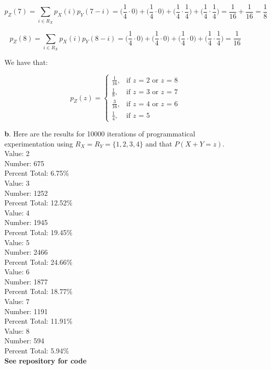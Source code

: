 \begin{solution}
\begin{itemize}
\[p_Z(7) = \sum_{i\in R_X} p_X(i)p_Y(7-i) = \bigg(\frac{1}{4}\cdot0\bigg) + \bigg(\frac{1}{4}\cdot0\bigg) + \bigg(\frac{1}{4}\cdot\frac{1}{4}\bigg) + \bigg(\frac{1}{4}\cdot\frac{1}{4}\bigg)=\frac{1}{16}+\frac{1}{16}=\frac{1}{8}\]

\[p_Z(8) = \sum_{i\in R_X} p_X(i)p_Y(8-i) = \bigg(\frac{1}{4}\cdot0\bigg) + \bigg(\frac{1}{4}\cdot0\bigg) + \bigg(\frac{1}{4}\cdot0\bigg) + \bigg(\frac{1}{4}\cdot\frac{1}{4}\bigg)=\frac{1}{16}\]

We have that:

\[p_Z(z) = \begin{cases}\frac{1}{16}, & \text{if $z$ = 2 or $z$ = 8}\\\frac{1}{8}, & \text{if $z$ = 3 or $z$ = 7}\\\frac{3}{16}, & \text{if $z$ = 4 or $z$ = 6}\\\frac{1}{4}, & \text{if $z$ = 5}\end{cases}\]
 
 
 
 \item[\textbf{b}.] Here are the results for 10000 iterations of programmatical experimentation using $R_X = R_Y = \{1,2,3,4\}$ and that $P(X + Y = z)$.\\  
Value: 2\\
Number: 675\\
Percent Total: 6.75\%\\

Value: 3\\
Number: 1252\\
Percent Total: 12.52\%\\

Value: 4\\
Number: 1945\\
Percent Total: 19.45\%\\

Value: 5\\
Number: 2466\\
Percent Total: 24.66\%\\

Value: 6\\
Number: 1877\\
Percent Total: 18.77\%\\

Value: 7\\
Number: 1191\\
Percent Total: 11.91\%\\

Value: 8\\
Number: 594\\
Percent Total: 5.94\%\\
 \textbf{See repository for code}
\end{itemize}
\end{solution}